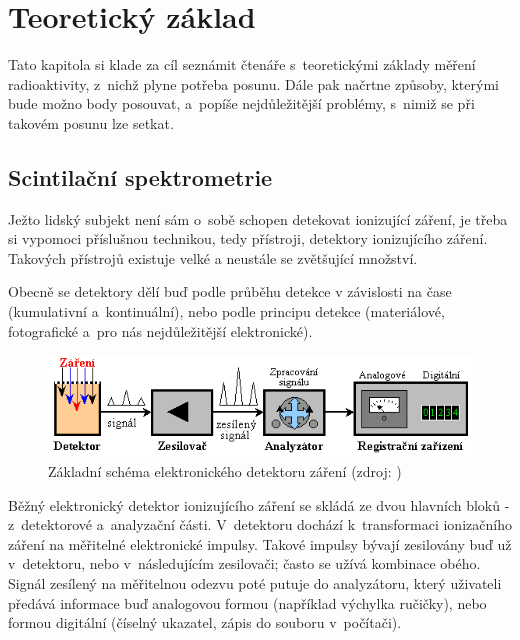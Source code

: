 \chapter{Teoretický základ}
\label{2-teorie}

Tato kapitola si klade za cíl seznámit čtenáře s~teoretickými základy měření radioaktivity, z~nichž
plyne potřeba posunu. Dále pak načrtne způsoby, kterými bude možno body posouvat, a~popíše
nejdůležitější problémy, s~nimiž se při takovém posunu lze setkat. 


\section{Scintilační spektrometrie}
\label{spektrometrie}

Ježto lidský subjekt není sám o~sobě schopen detekovat ionizující záření, je třeba si vypomoci příslušnou
technikou, tedy přístroji, detektory ionizujícího záření. Tako\-vých přístrojů existuje velké
a neustále se zvětšující množství. 

Obecně se detektory dělí buď podle průběhu detekce v závislosti na čase (kumulativní a~kontinuální),
nebo podle principu detekce (materiálové, fotografické a~pro nás nejdůležitější elektronické). 

  \begin{figure}[H]
   \centering
	\includegraphics{./pictures/elektronicky-detektor.png}
	\caption[Základní schéma elektronického detektoru záření]{Základní schéma elektronického
	detektoru záření
	(zdroj: \cite{spektrometrie})}
      \label{fig:elektronicky-detektor}
  \end{figure}

Běžný elektronický detektor ionizujícího záření se skládá ze dvou hlavních bloků - z~detektorové
a~analyzační části. V~detektoru dochází k~transformaci ionizačního záření na měřitelné
elektronické impulsy. Takové impulsy bývají zesilovány buď už v~detektoru, nebo v~následujícím
zesilovači; často se užívá kombinace obého. Signál zesílený na měřitelnou odezvu poté putuje do
analyzátoru, který uživateli předává informace buď analogovou formou (například výchylka ručičky),
nebo formou di\-gitální (číselný ukazatel, zápis do souboru v~počítači). 

